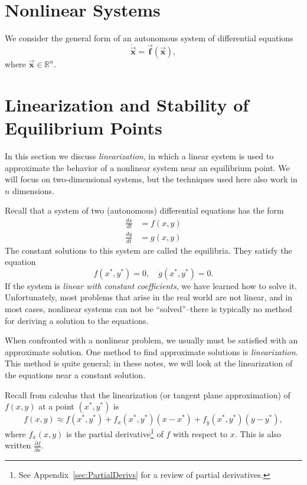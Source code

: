 \documentclass[reqno]{immbook}
\newcommand{\Real}{\mathbb{R}}
\newcommand{\BF}{\vec{\textbf{f}}}
\newcommand{\BX}{\vec{\textbf{x}}}
\begin{document}
\section{Nonlinear Systems}
We consider the general form of an autonomous
system of differential equations
\begin{equation}
   \dot{\BX} = \BF\left(\BX\right),
   \label{eqn:NONLIN}
\end{equation}
where $\BX \in \Real^{n}$.
\section{Linearization and Stability of Equilibrium Points}
\label{sec:DELinearization}

In this section we discuss \emph{linearization},
in which a linear system
is used to approximate the behavior of a nonlinear system
near an equilibrium point.
We will focus on two-dimensional systems, but the
techniques used here also work in $n$ dimensions.

Recall that a system of two (autonomous) differential equations has the form
\begin{equation}
\begin{split}
  \frac{dx}{dt} & = f(x,y) \\
  \frac{dy}{dt} & = g(x,y)
\end{split}
\label{eqn:de}
\end{equation}
The constant solutions to this system are called the equilibria.
They satisfy the equation
\begin{equation}
    f(x^*,y^*) = 0, \quad g(x^*,y^*) = 0.
\end{equation}
If the system is \emph{linear with constant
coefficients}, we have learned
how to solve it.  Unfortunately, most problems that arise in the
real world are not linear,
and in most cases, nonlinear systems can not be ``solved''--there is
typically no method for deriving a solution to the equations.

When confronted with a nonlinear problem, we usually must
be satisfied with an approximate solution.
One method to find approximate solutions is \emph{linearization}.
This method is quite general; in these notes, we will look at the
linearization of the equations near a constant solution.

Recall from calculus
that the linearization (or tangent plane approximation)
of $f(x,y)$ at a point $(x^*,y^*)$ is
\begin{equation}
  f(x,y) \approx f(x^*,y^*)+f_x(x^*,y^*)(x-x^*) + f_y(x^*,y^*)(y-y^*),
\end{equation}
where $f_x(x,y)$ is the partial derivative\footnote{%
See Appendix~\ref{sec:PartialDerivs} for a review
of partial derivatives.}
of $f$ with respect to $x$.
This is also written $\frac{\partial f}{\partial x}$.
\end{document}
